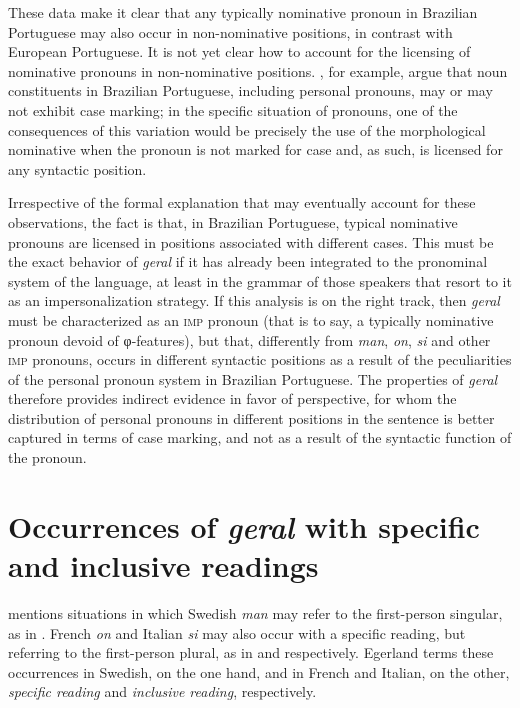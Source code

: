 \documentclass[output=paper]{langscibook}
\begin{document}
{These data make it clear that any typically nominative pronoun in Brazilian Portuguese may also occur in non-nominative positions, in contrast with European Portuguese. It is not yet clear how to account for the licensing of nominative pronouns in non-nominative positions. \citet{AvelarGalves2016}, for example, argue that noun constituents in Brazilian Portuguese, including personal pronouns, may or may not exhibit case marking; in the specific situation of pronouns, one of the consequences of this variation would be precisely the use of the morphological nominative when the pronoun is not marked for case and, as such, is licensed for any syntactic position.}

{Irrespective of the formal explanation that may eventually account for these observations, the fact is that, in Brazilian Portuguese, typical nominative pronouns are licensed in positions associated with different cases. This must be the exact behavior of} \textit{geral} {if it has already been integrated to the pronominal system of the language, at least in the grammar of those speakers that resort to it as an impersonalization strategy. If this analysis is on the right track, then} \textit{geral} {must be characterized as an \textsc{imp} pronoun (that is to say, a typically nominative pronoun devoid of φ-fea\-tures), but that, differently from} {\textit{man}}, {\textit{on}}, {\textit{si}} {and other \textsc{imp} pronouns, occurs in different syntactic positions as a result of the peculiarities of the personal pronoun system in Brazilian Portuguese. The properties of} \textit{geral} {therefore provides indirect evidence in favor of  perspective, for whom the distribution of personal pronouns in different positions in the sentence is better captured in terms of case marking, and not as a result of the syntactic function of the pronoun.}

\section{Occurrences of \textit{geral} with specific and inclusive readings}\label{sec:avelar:6}
{\citet[82--83]{Egerland2003} mentions situations in which Swedish \textit{man} may refer to the first-person singular, as in . French \textit{on} }{and Italian} {\textit{si}} {may also occur with a specific reading, but referring to the first-person plural, as in  and  respectively. Egerland terms these occurrences in Swedish, on the one hand, and in French and Italian, on the other,} {\textit{specific reading} }{and} {\textit{inclusive reading}}{, respectively.}
\end{document}
